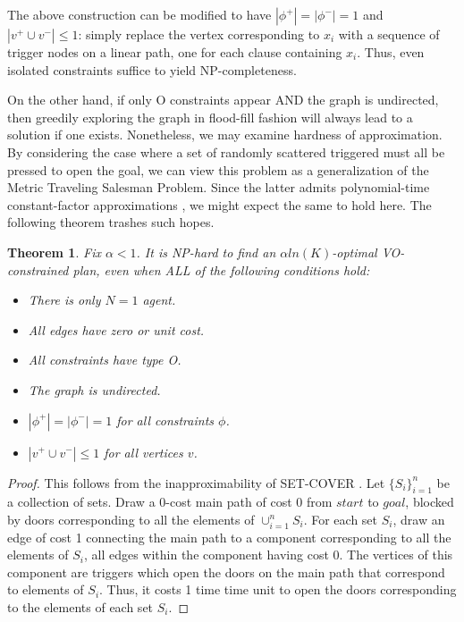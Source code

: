 \documentclass[letterpaper]{article}
\newtheorem{thm}{Theorem}
\begin{document}
The above construction can be modified to have $|\phi^+| = |\phi^-| = 1$ and $|v^+ \cup v^-| \le 1$: simply replace the vertex corresponding to $x_i$ with a sequence of trigger nodes on a linear path, one for each clause containing $x_i$. Thus, even isolated constraints suffice to yield NP-completeness.

On the other hand, if only O constraints appear AND the graph is undirected, then greedily exploring the graph in flood-fill fashion will always lead to a solution if one exists. Nonetheless, we may examine hardness of approximation. By considering the case where a set of randomly scattered triggered must all be pressed to open the goal, we can view this problem as a generalization of the Metric Traveling Salesman Problem. Since the latter admits polynomial-time constant-factor approximations \cite{christofides1976worst}, we might expect the same to hold here. The following theorem trashes such hopes.

\begin{thm}
\label{thm:NP2}
Fix $\alpha < 1$. It is NP-hard to find an $\alpha ln(K)$-optimal VO-constrained plan, even when ALL of the following conditions hold:
\begin{itemize}
\item There is only $N=1$ agent.
\item All edges have zero or unit cost.
\item All constraints have type O.
\item The graph is undirected.
\item $|\phi^+| = |\phi^-| = 1$ for all constraints $\phi$.
\item $|v^+ \cup v^-| \le 1$ for all vertices $v$.
\end{itemize}
\end{thm}

\begin{proof}
This follows from the inapproximability of SET-COVER \cite{moshkovitz2012projection}. Let $\{S_i\}_{i=1}^n$ be a collection of sets. Draw a 0-cost main path of cost 0 from $start$ to $goal$, blocked by doors corresponding to all the elements of $\cup_{i=1}^n S_i$. For each set $S_i$, draw an edge of cost 1 connecting the main path to a component corresponding to all the elements of $S_i$, all edges within the component having cost 0. The vertices of this component are triggers which open the doors on the main path that correspond to elements of $S_i$. Thus, it costs 1 time time unit to open the doors corresponding to the elements of each set $S_i$.
\end{proof}
\end{document}
